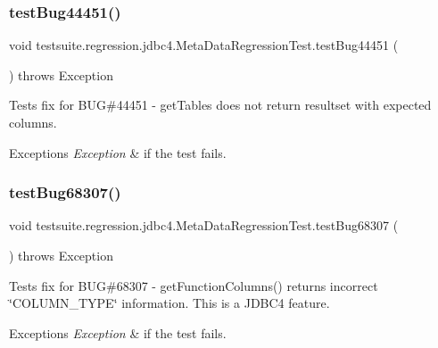 \subsubsection{\texorpdfstring{test\+Bug44451()}{testBug44451()}}
{\footnotesize\ttfamily void testsuite.\+regression.\+jdbc4.\+Meta\+Data\+Regression\+Test.\+test\+Bug44451 (\begin{DoxyParamCaption}{ }\end{DoxyParamCaption}) throws Exception}

Tests fix for B\+UG\#44451 -\/ get\+Tables does not return resultset with expected columns.


\begin{DoxyExceptions}{Exceptions}
{\em Exception} & if the test fails. \\
\hline
\end{DoxyExceptions}
\mbox{\label{classtestsuite_1_1regression_1_1jdbc4_1_1_meta_data_regression_test_a7b022391fcc7ec9afdfd1e7691d5e730}} 
\subsubsection{\texorpdfstring{test\+Bug68307()}{testBug68307()}}
{\footnotesize\ttfamily void testsuite.\+regression.\+jdbc4.\+Meta\+Data\+Regression\+Test.\+test\+Bug68307 (\begin{DoxyParamCaption}{ }\end{DoxyParamCaption}) throws Exception}

Tests fix for B\+UG\#68307 -\/ get\+Function\+Columns() returns incorrect \char`\"{}\+C\+O\+L\+U\+M\+N\+\_\+\+T\+Y\+P\+E\char`\"{} information. This is a J\+D\+B\+C4 feature.


\begin{DoxyExceptions}{Exceptions}
{\em Exception} & if the test fails. \\
\hline
\end{DoxyExceptions}
\mbox{\label{classtestsuite_1_1regression_1_1jdbc4_1_1_meta_data_regression_test_a2e4de53b0759902efe0dadbb85254323}} 
